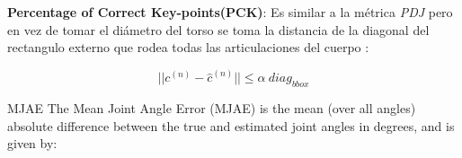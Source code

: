 \textbf{Percentage of Correct Key-points(PCK)}: Es similar a la métrica \textit{PDJ} pero en vez de
tomar el diámetro del torso se toma la distancia de la diagonal del rectangulo externo que rodea
todas las articulaciones del cuerpo \cite{6380498}:

\begin{equation}
    ||c^{(n)} - \hat{c}^{(n)}|| \le \alpha\ diag_{bbox}
    \label{eq:PCK}
\end{equation}




MJAE
The Mean Joint Angle Error (MJAE) is the mean (over all angles)
absolute difference between the true and estimated joint
angles in degrees, and is given by:




